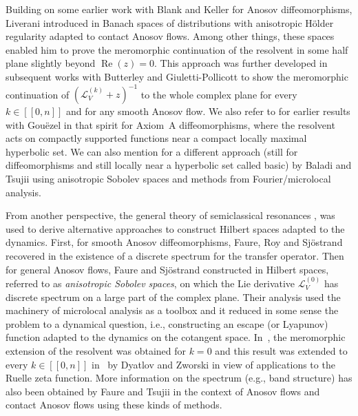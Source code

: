 \documentclass[11pt]{article}
\newcommand{\ie}{i.e.,\xspace}
\newcommand{\eg}{e.g.,\xspace}
\newcommand{\lcr}{[\![}
\newcommand{\rcr}{]\!]}
\theoremstyle{definition}
\theoremstyle{plain}
\newcommand{\Lie}{\mathcal{L}}
\DeclareMathOperator{\re}{Re}
\begin{document}
Building on some earlier work \cite{BKL} with Blank and Keller for Anosov diffeomorphisms, Liverani introduced in \cite{liverani} Banach spaces of distributions with anisotropic Hölder regularity adapted to contact Anosov flows. Among other things, these spaces enabled him to prove the meromorphic continuation of the resolvent in some half plane slightly beyond $\re(z)=0$. This approach was further developed in subsequent works with Butterley \cite{butterley-liverani} and Giuletti-Pollicott \cite{GLP} to show the meromorphic continuation of $(\Lie_V^{(k)}+z)^{-1}$ to the whole complex plane for every $k\in\lcr0,n\rcr$ and for any smooth Anosov flow. We also refer to \cite{gouezel-liverani_2006, gouezel-liverani} for earlier results with Gouëzel in that spirit for Axiom~A diffeomorphisms, where the resolvent acts on compactly supported functions near a compact locally maximal hyperbolic set. We can also mention \cite{baladi-tsujii_2007} for a different approach (still for diffeomorphisms and still locally near a hyperbolic set called basic) by Baladi and Tsujii using anisotropic Sobolev spaces and methods from Fourier/microlocal analysis.

From another perspective, the general theory of semiclassical resonances \cite{DZ-book}, \cite{helffer-sjostrand} was used to derive alternative approaches to construct Hilbert spaces adapted to the dynamics. First, for smooth Anosov diffeomorphisms, Faure, Roy and Sjöstrand recovered in \cite{FRS} the existence of a discrete spectrum for the transfer operator. Then for general Anosov flows, Faure and Sjöstrand constructed in \cite{FS} Hilbert spaces, referred to as \textit{anisotropic Sobolev spaces}, on which the Lie derivative $\Lie_V^{(0)}$ has discrete spectrum on a large part of the complex plane. Their analysis used the machinery of microlocal analysis as a toolbox and it reduced in some sense the problem to a dynamical question, \ie constructing an escape (or Lyapunov) function adapted to the dynamics on the cotangent space. In~\cite{FS}, the meromorphic extension of the resolvent was obtained for $k = 0$ and this result was extended to every $k\in\lcr0,n\rcr$ in~\cite{dyatlov-zworski} by Dyatlov and Zworski in view of applications to the Ruelle zeta function. More information on the spectrum (\eg band structure) has also been obtained by Faure and Tsujii \cite{tsujii_2010,tsujii_2012, faure-tsujii2013,faure-tsujii2017,faure-tsujii2019,faure-tsujii2021} in the context of Anosov flows and contact Anosov flows using these kinds of methods.
\end{document}
